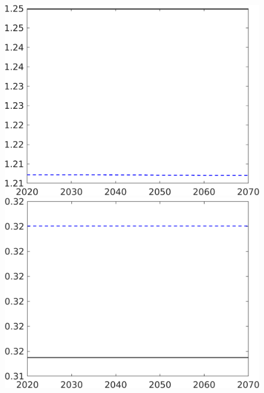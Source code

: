 \begin{figure}[h!!]
\begin{minipage}[]{0.32\textwidth}
	\end{minipage}
	\begin{minipage}[]{0.32\textwidth}
		\includegraphics[width=1\textwidth]{../../codding_model/own_basedOnFried/optimalPol_190722_tidiedUp/figures/all_10Aout22/CountTaul_modxgr_target_pg_spillover0_sep1_extern0_PV1_etaa0.79_lgd0.png}
	\end{minipage}
	\begin{minipage}[]{0.32\textwidth}
		\includegraphics[width=1\textwidth]{../../codding_model/own_basedOnFried/optimalPol_190722_tidiedUp/figures/all_10Aout22/CountTaul_modxgr_target_pf_spillover0_sep1_extern0_PV1_etaa0.79_lgd0.png}

\end{minipage}
\end{figure}

